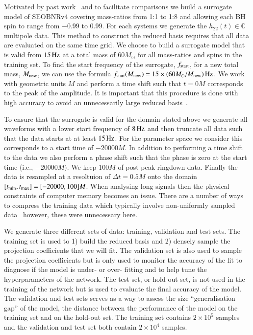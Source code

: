 \documentclass[aps,prd,reprint,superscriptaddress,preprintnumbers,showpacs,nofootinbib]{revtex4-1}
\begin{document}
Motivated by past work~\cite{PhysRevD.99.064045} and to facilitate comparisons
we build a surrogate model of SEOBNRv4 covering mass-ratios from 1:1 to
1:8 and allowing each BH spin to range from $-0.99$ to $0.99$. For each systems
we generate the $h_{22}(t) \in \mathbb{C}$ multipole data. This method to
construct the reduced basis requires that all data are evaluated on the same
time grid. We choose to build a surrogate model that is valid from $15
\,\rm{Hz}$ at a total mass of $60 M_\odot$ for all mass-ratios and spins in the
training set. To find the start frequency of the surrogate, $f_{\rm{start}}$,
for a new total mass, $M_{\rm{new}}$, we can use the formula
$f_{\rm{start}}(M_{\rm{new}}) = 15 \times (60 M_\odot/M_{\rm{new}}) \, \rm{Hz}$.
We work with geometric units $M$ and perform a time shift such that $t=0 M$
corresponds to the peak of the amplitude.
It is important that this procedure is done with high accuracy to avoid
an unnecessarily large reduced basis~\cite{PhysRevX.4.031006}.

To ensure that the surrogate is valid for the domain stated above we generate
all waveforms with a lower start frequency of $8 \,\rm{Hz}$ and then truncate
all data such that the data starts at at least $15 \,\rm{Hz}$. For the parameter
space we consider this corresponds to a start time of $-20000 M$. In addition
to performing a time shift to the data we also perform a phase shift such that
the phase is zero at the start time (i.e., $-20000 M$). We keep $100 M$ of
post-peak ringdown data. Finally the data is resampled at a resoltuion of
$\Delta t = 0.5 M$ onto the domain $[t_{\rm{min}}, t_{\rm{max}}] = [-20000, 100] M$.
When analysing long signals then the physical constraints of computer memory
becomes an issue. There are a number of ways to compress the training data which
typically involve non-uniformly sampled data~\cite{PhysRevD.94.044031,
2016arXiv161107529G, 2017CQGra..34k5006V, 2020arXiv200110897G} however,
these were unnecessary here.

We generate three different sets of data: training, validation and test sets.
The training set is used to 1) build the reduced basis and 2) densely sample the
projection coefficients that we will fit. The validation set is also used to
sample the projection coefficients but is only used to monitor the accuracy of
the fit to diagnose if the model is under- or over- fitting and to help tune the
hyperparameters of the network. The test set, or hold-out set, is not used in
the training of the network but is used to evaluate the final accuracy of the
model. The validation and test sets serves as a way to assess the size
``generalisation gap'' of the model, the distance between the performance of the
model on the training set and on the hold-out set. The training set contains $2
\times 10^5$ samples and the validation and test set both contain $2 \times 10^4$
samples.
\end{document}
